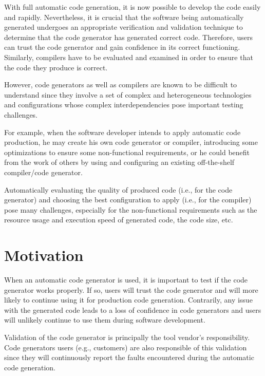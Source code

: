 With full automatic code generation, it is now possible to develop the code easily and rapidly. Nevertheless, it is crucial that the software being automatically generated undergoes an appropriate verification and validation technique to determine that the code generator has generated correct code. Therefore, users can trust the code generator and gain confidence in its correct functioning. Similarly, compilers have to be evaluated and examined in order to ensure that the code they produce is correct.

However, code generators as well as compilers are known to be difficult to understand since they involve a set of complex and heterogeneous technologies and configurations whose complex interdependencies pose important testing challenges. 

For example, when the software developer intends to apply automatic code production, he may create his own code generator or compiler, introducing some optimizations to ensure some non-functional requirements, or he could benefit from the work of others by using and configuring an existing off-the-shelf compiler/code generator. 

Automatically evaluating the quality of produced code (i.e., for the code generator) and choosing the best configuration to apply (i.e., for the compiler) pose many challenges, especially for the non-functional requirements such as the resource usage and execution speed of generated code, the code size, etc.


\section{Motivation}

When an automatic code generator is used, it is important to test if the code generator works properly.
If so, users will trust the code generator and will more likely to continue using it for production code generation. Contrarily, any issue with the generated code leads to a loss of confidence in code generators and users will unlikely continue to use them during software development.
 
Validation of the code generator is principally the tool vendor's responsibility. Code generators users (e.g., customers) are also responsible of this validation since they will continuously report the faults encountered during the automatic code generation. 

